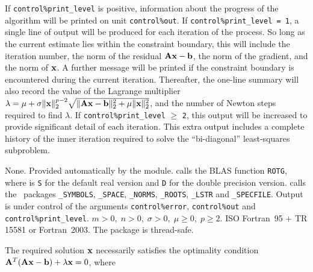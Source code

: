 \documentclass{galahad}
\newcommand{\packagename}{L2\-RT}
\begin{document}

\galinfo
If {\tt control\%print\_level} is positive, information about the progress 
of the algorithm will be printed on unit {\tt control\-\%\-out}.
If {\tt control\%print\_level = 1}, a single line of output will be produced  
for each iteration of the process. So long as the current estimate lies 
within the constraint boundary, this will include  
the iteration number, the norm of the residual ${\mathbf{A}}{\mathbf{x}}-{\mathbf{b}}$, the 
norm of the gradient, and the norm of ${\mathbf{x}}$.
A further message will be printed  
if the constraint boundary is encountered during the current iteration.  
Thereafter, the one-line summary will also record the value of the Lagrange
multiplier 
$\lambda = \mu + \sigma \|{\mathbf{x}}\|_2^{p-2} 
 \sqrt{\| {\mathbf{A}} {\mathbf{x}} - {\mathbf{b}} \|_2^2 + \mu \|{\mathbf{x}}\|_2^2}$,
and the number of Newton steps required to find $\lambda$.
If {\tt control\%print\_level} $\geq$ {\tt 2}, this  
output will be increased to provide significant detail of each iteration.  
This extra output includes a complete history of the inner iteration required 
to solve the ``bi-diagonal'' least-squares subproblem.


\galgeneral

\galcommon None.
\galworkspace Provided automatically by the module.
\galroutines {\tt \packagename\_solve} calls the
BLAS function {\tt *ROTG}, where {\tt *} is {\tt S} for 
the default real version and {\tt D} for the double precision version.
\galmodules {\tt \packagename\_solve} calls the \galahad\ packages 
{\tt \libraryname\_SY\-M\-BOLS}, 
{\tt \libraryname\_SPACE}, 
{\tt \libraryname\_NORMS}, 
{\tt \libraryname\_\-ROOTS},
{\tt \libraryname\_LSTR} and
{\tt \libraryname\_SPECFILE}.
\galio Output is under control of the arguments 
{\tt control\%error}, {\tt control\%out} and {\tt control\%print\_level}.
\galrestrictions $m > 0, \; n  >  0, \;  \sigma  >  0,  \; 
 \mu  \geq  0, \; p \geq 2$. 
\galportability ISO Fortran~95 + TR 15581 or Fortran~2003.
The package is thread-safe.


\galmethod
The required solution ${\mathbf{x}}$ necessarily satisfies the optimality condition 
${\mathbf{A}}^T ( {\mathbf{A}} {\mathbf{x}} - {\mathbf{b}} ) + \lambda {\mathbf{x}} = 0$, where 
\end{document}
